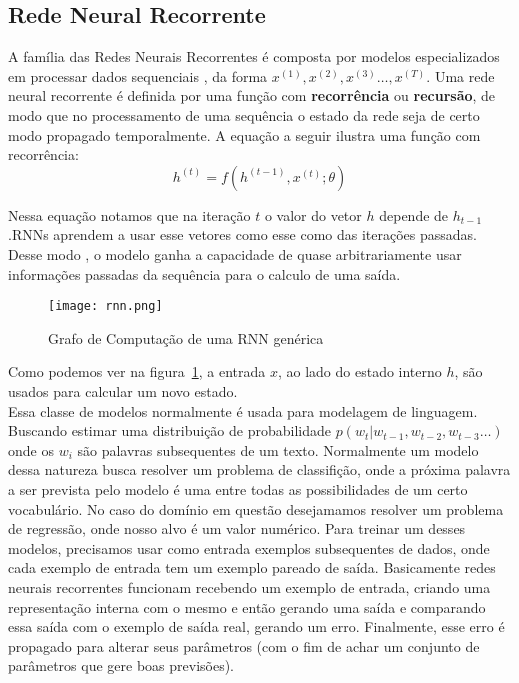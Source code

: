 \subsection{Rede Neural Recorrente}
% 

A família das Redes Neurais Recorrentes é composta por modelos especializados
em processar dados sequenciais \citep{dlbook}, da forma $x^{(1)},x^{(2)} ,x^{(3)}\dots ,x^{(T)}$. Uma rede neural recorrente é definida por uma função com
\textbf{recorrência} ou \textbf{recursão}, de modo que no processamento de uma
sequência o estado da rede seja de certo modo propagado temporalmente. A equação
a seguir ilustra uma função com recorrência: \\

\[h^{(t)} = f(h^{(t-1)},x^{(t)};\theta)\]

Nessa equação notamos que na iteração $t$ o valor do vetor $h$ depende de
$h_{t-1}$.RNNs aprendem a usar esse vetores como esse como
 das iterações passadas. Desse modo , o modelo ganha a capacidade
de quase arbitrariamente usar informações passadas da sequência para o calculo
de uma saída. 

\begin{figure}[H]
\centering
\texttt{[image: rnn.png]}
\caption{Grafo de Computação de uma RNN genérica \citep{dlbook}}
\label{fig:rnngraph}
\end{figure}

Como podemos ver na figura~\ref{fig:rnngraph}, a entrada $x$, ao lado do estado
interno $h$, são usados para calcular um novo estado. 
\\

Essa classe de modelos normalmente é usada para modelagem de linguagem. Buscando
estimar uma distribuição de probabilidade $p(w_t | w_{t-1},w_{t-2},w_{t-3} \dots
) $ onde os $w_i$ são palavras subsequentes de um texto. Normalmente um modelo
dessa natureza busca resolver um problema de classifição, onde a próxima palavra
a ser prevista pelo modelo é uma entre todas as possibilidades de um certo
vocabulário. No caso do domínio em questão desejamamos resolver um problema de
regressão, onde nosso alvo é um valor numérico. Para treinar um desses modelos,
precisamos usar como entrada exemplos subsequentes de dados, onde cada exemplo
de entrada tem um exemplo pareado de saída. Basicamente redes neurais
recorrentes funcionam recebendo um exemplo de entrada, criando uma representação
interna com o mesmo e então gerando uma saída e comparando essa saída com o
exemplo de saída real, gerando um erro. Finalmente, esse erro é propagado para
alterar seus parâmetros (com o fim de achar um conjunto de parâmetros que gere
boas previsões). \\ 


